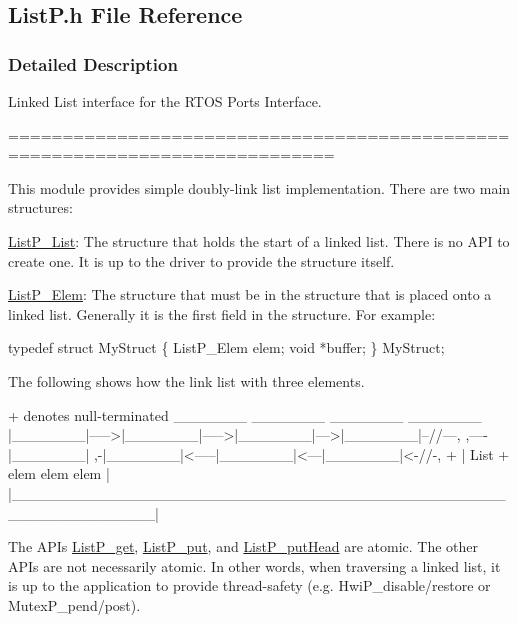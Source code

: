 \subsection{List\+P.\+h File Reference}
\label{_list_p_8h}


\subsubsection{Detailed Description}
Linked List interface for the R\+T\+O\+S Ports Interface. 

============================================================================

This module provides simple doubly-\/link list implementation. There are two main structures\+:
\begin{DoxyItemize}
\item \hyperlink{struct_list_p___list}{List\+P\+\_\+\+List}\+: The structure that holds the start of a linked list. There is no A\+P\+I to create one. It is up to the driver to provide the structure itself.
\item \hyperlink{struct_list_p___elem}{List\+P\+\_\+\+Elem}\+: The structure that must be in the structure that is placed onto a linked list. Generally it is the first field in the structure. For example\+: 
\begin{DoxyCode}
\textcolor{keyword}{typedef} \textcolor{keyword}{struct }MyStruct \{
    ListP_Elem elem;
    \textcolor{keywordtype}{void} *buffer;
\} MyStruct;
\end{DoxyCode}

\end{DoxyItemize}

The following shows how the link list with three elements.


\begin{DoxyCode}
+ denotes null-terminated
        \_\_\_\_\_\_\_        \_\_\_\_\_\_\_        \_\_\_\_\_\_\_      \_\_\_\_\_\_\_
       |\_\_\_\_\_\_\_|----->|\_\_\_\_\_\_\_|----->|\_\_\_\_\_\_\_|--->|\_\_\_\_\_\_\_|--\textcolor{comment}{//---,}
  ,----|\_\_\_\_\_\_\_|    ,-|\_\_\_\_\_\_\_|<-----|\_\_\_\_\_\_\_|<---|\_\_\_\_\_\_\_|<-\textcolor{comment}{//-, +}
  |      List       +   elem           elem          elem       |
  |\_\_\_\_\_\_\_\_\_\_\_\_\_\_\_\_\_\_\_\_\_\_\_\_\_\_\_\_\_\_\_\_\_\_\_\_\_\_\_\_\_\_\_\_\_\_\_\_\_\_\_\_\_\_\_\_\_\_\_\_\_|
\end{DoxyCode}


The A\+P\+Is \hyperlink{_list_p_8h_a10d70aec4447b99682fda9a9a04bac41}{List\+P\+\_\+get}, \hyperlink{_list_p_8h_a0a7f250522308dd73892117dd6528d3b}{List\+P\+\_\+put}, and \hyperlink{_list_p_8h_a1f55484fc6fc6e5ab515e6652fde61bf}{List\+P\+\_\+put\+Head} are atomic. The other A\+P\+Is are not necessarily atomic. In other words, when traversing a linked list, it is up to the application to provide thread-\/safety (e.\+g. Hwi\+P\+\_\+disable/restore or Mutex\+P\+\_\+pend/post).

